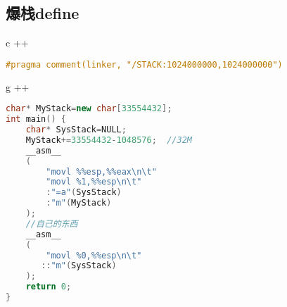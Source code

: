 \subsection{爆栈define}
c ++
    \begin{lstlisting}[language=c++]
#pragma comment(linker, "/STACK:1024000000,1024000000")
    \end{lstlisting}
g ++
    \begin{lstlisting}[language=c++]
char* MyStack=new char[33554432];
int main() {
    char* SysStack=NULL;
    MyStack+=33554432-1048576;  //32M
    __asm__
    (
        "movl %%esp,%%eax\n\t"
        "movl %1,%%esp\n\t"
        :"=a"(SysStack)
        :"m"(MyStack)
    );
    //自己的东西
    __asm__
    (
        "movl %0,%%esp\n\t"
       ::"m"(SysStack) 
    );
    return 0;
}
    \end{lstlisting}

